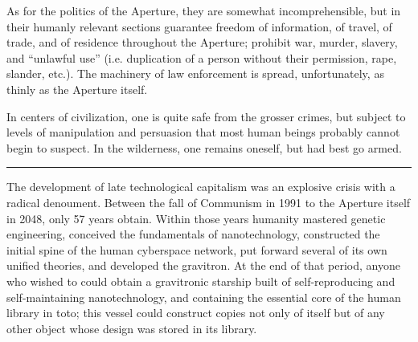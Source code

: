 \documentclass[english,11pt,letterpaper,onecolumn]{scrbook}
\begin{document}
	As for the politics of the Aperture, they are somewhat incomprehensible, but in their humanly relevant sections guarantee freedom of information, of travel, of trade, and of residence throughout the Aperture; prohibit war, murder, slavery, and ``unlawful use'' (i.e. duplication of a person without their permission, rape, slander, etc.).  The machinery of law enforcement is spread, unfortunately, as thinly as the Aperture itself.  

	In centers of civilization, one is quite safe from the grosser crimes, but subject to levels of manipulation and persuasion that most human beings probably cannot begin to suspect.  In the wilderness, one remains oneself, but had best go armed.

\begin{center}\rule[3pt]{2in}{0.5pt}\end{center}

	The development of late technological capitalism was an explosive crisis with a radical denoument.  Between the fall of Communism in 1991 to the Aperture itself in 2048, only 57 years obtain.  Within those years humanity mastered genetic engineering, conceived the fundamentals of nanotechnology, constructed the initial spine of the human cyberspace network, put forward several of its own unified theories, and developed the gravitron.  At the end of that period, anyone who wished to could obtain a gravitronic starship built of self-reproducing and self-maintaining nanotechnology, and containing the essential core of the human library in toto; this vessel could construct copies not only of itself but of any other object whose design was stored in its library.
	
\end{document}
